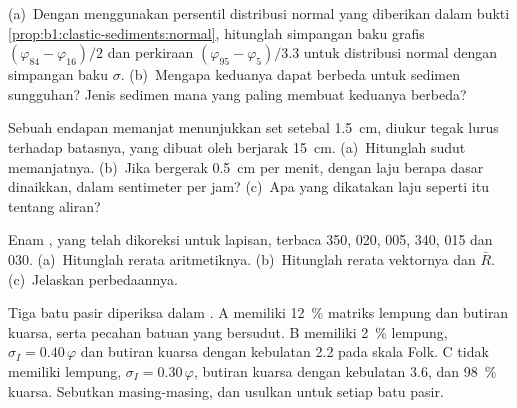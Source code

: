 \begin{exercise}[$\star\star$]\label{exo:b1:clastic-sediments:5}
(a)~Dengan menggunakan persentil distribusi normal yang diberikan dalam bukti \cref{prop:b1:clastic-sediments:normal}, hitunglah simpangan baku grafis $(\varphi_{84} - \varphi_{16})/2$ dan perkiraan $(\varphi_{95} - \varphi_5)/3.3$ untuk distribusi normal dengan simpangan baku $\sigma$. (b)~Mengapa keduanya dapat berbeda untuk sedimen sungguhan? Jenis sedimen mana yang paling membuat keduanya berbeda?
\end{exercise}

\begin{exercise}[$\star\star$]\label{exo:b1:clastic-sediments:6}
Sebuah endapan  memanjat menunjukkan set setebal \qty{1.5}{cm}, diukur tegak lurus terhadap batasnya, yang dibuat oleh  berjarak \qty{15}{cm}. (a)~Hitunglah sudut memanjatnya. (b)~Jika  bergerak \qty{0.5}{cm} per menit, dengan laju berapa dasar dinaikkan, dalam sentimeter per jam? (c)~Apa yang dikatakan laju seperti itu tentang aliran?
\end{exercise}

\begin{exercise}[$\star\star$]\label{exo:b1:clastic-sediments:7}
Enam  , yang telah dikoreksi untuk  lapisan, terbaca 350, 020, 005, 340, 015 dan 030. (a)~Hitunglah rerata aritmetiknya. (b)~Hitunglah rerata vektornya dan $\bar R$. (c)~Jelaskan perbedaannya.
\end{exercise}

\begin{exercise}[$\star\star$]\label{exo:b1:clastic-sediments:8}
Tiga batu pasir diperiksa dalam . A memiliki \qty{12}{\percent} matriks lempung dan butiran kuarsa,  serta pecahan batuan yang bersudut. B memiliki \qty{2}{\percent} lempung, $\sigma_I = 0.40\,\varphi$ dan butiran kuarsa dengan kebulatan \num{2.2} pada skala Folk. C tidak memiliki lempung, $\sigma_I =
0.30\,\varphi$, butiran kuarsa dengan kebulatan \num{3.6}, dan \qty{98}{\percent} kuarsa. Sebutkan  masing-masing, dan usulkan  untuk setiap batu pasir.
\end{exercise}

